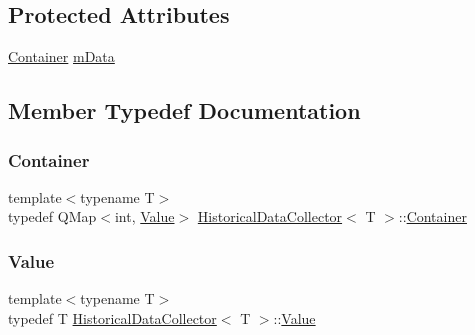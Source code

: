 \subsection*{Protected Attributes}
\begin{DoxyCompactItemize}
\item 
\mbox{\hyperlink{class_historical_data_collector_ab9dd1d27498b0728df0f5c0f2c9c873f}{Container}} \mbox{\hyperlink{class_historical_data_collector_a38ce7ae12ccfa107916c439ec273c8a5}{m\+Data}}
\end{DoxyCompactItemize}


\subsection{Member Typedef Documentation}
\mbox{\label{class_historical_data_collector_ab9dd1d27498b0728df0f5c0f2c9c873f}} 
\subsubsection{\texorpdfstring{Container}{Container}}
{\footnotesize\ttfamily template$<$typename T$>$ \\
typedef Q\+Map$<$int, \mbox{\hyperlink{class_historical_data_collector_a8b64738808b9cea9f590c86b2685c944}{Value}}$>$ \mbox{\hyperlink{class_historical_data_collector}{Historical\+Data\+Collector}}$<$ T $>$\+::\mbox{\hyperlink{class_historical_data_collector_ab9dd1d27498b0728df0f5c0f2c9c873f}{Container}}}

\mbox{\label{class_historical_data_collector_a8b64738808b9cea9f590c86b2685c944}} 
\subsubsection{\texorpdfstring{Value}{Value}}
{\footnotesize\ttfamily template$<$typename T$>$ \\
typedef T \mbox{\hyperlink{class_historical_data_collector}{Historical\+Data\+Collector}}$<$ T $>$\+::\mbox{\hyperlink{class_historical_data_collector_a8b64738808b9cea9f590c86b2685c944}{Value}}}



